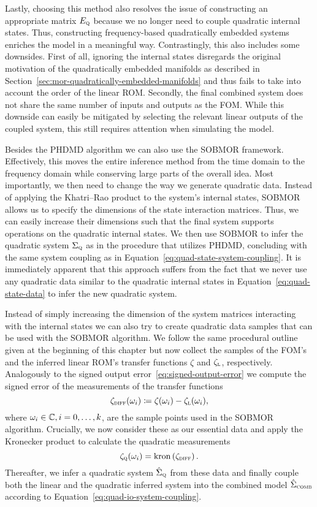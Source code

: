 Lastly, choosing this method also resolves the issue of constructing an appropriate matrix $E_{\textnormal{\scshape q}}$ because we no longer need to couple quadratic internal states.
Thus, constructing frequency-based quadratically embedded systems enriches the model in a meaningful way.
Contrastingly, this also includes some downsides.
First of all, ignoring the internal states disregards the original motivation of the quadratically embedded manifolds as described in Section~\ref{sec:mor-quadratically-embedded-manifolds} and thus fails to take into account the order of the linear \ac{ROM}.
Secondly, the final combined system does not share the same number of inputs and outputs as the \ac{FOM}.
While this downside can easily be mitigated by selecting the relevant linear outputs of the coupled system, this still requires attention when simulating the model.

Besides the \ac{PHDMD} algorithm we can also use the \ac{SOBMOR} framework.
Effectively, this moves the entire inference method from the time domain to the frequency domain while conserving large parts of the overall idea.
Most importantly, we then need to change the way we generate quadratic data.
Instead of applying the Khatri--Rao product to the system's internal states, \ac{SOBMOR} allows us to specify the dimensions of the state interaction matrices.
Thus, we can easily increase their dimensions such that the final system supports operations on the quadratic internal states.
We then use \ac{SOBMOR} to infer the quadratic system $\Sigma_{\textnormal{\scshape q}}$ as in the procedure that utilizes \ac{PHDMD}, concluding with the same system coupling as in Equation~\eqref{eq:quad-state-system-coupling}.
It is immediately apparent that this approach suffers from the fact that we never use any quadratic data similar to the quadratic internal states in Equation~\eqref{eq:quad-state-data} to infer the new quadratic system.

Instead of simply increasing the dimension of the system matrices interacting with the internal states we can also try to create quadratic data samples that can be used with the \ac{SOBMOR} algorithm.
We follow the same procedural outline given at the beginning of this chapter but now collect the samples of the \ac{FOM}'s and the inferred linear \ac{ROM}'s transfer functions $\zeta$ and $\zeta_{\textnormal{\scshape l}}$, respectively.
Analogously to the signed output error~\eqref{eq:signed-output-error} we compute the signed error of the  measurements of the transfer functions
\begin{equation*}
    \zeta_{\textnormal{\scshape diff}}(\omega_i) \coloneqq \zeta(\omega_i) - \zeta_{\textnormal{\scshape l}}(\omega_i),
\end{equation*}
where $\omega_i \in \mathbb{C}, i = 0, \dots, k$, are the sample points used in the \ac{SOBMOR} algorithm.
Crucially, we now consider these as our essential data and apply the Kronecker product to calculate the quadratic measurements
\begin{equation*}
    \zeta_{\textnormal{\scshape q}}(\omega_i) = \mathop{}\!\mathrm{kron}\left(\zeta_{\textnormal{\scshape diff}}\right).
\end{equation*}
Thereafter, we infer a quadratic system $\hat{\Sigma}_{\textnormal{\scshape q}}$ from these data and finally couple both the linear and the quadratic inferred system into the combined model $\hat{\Sigma}_{\textnormal{\scshape comb}}$ according to Equation~\eqref{eq:quad-io-system-coupling}.
